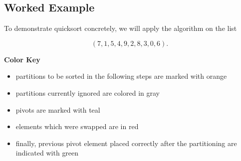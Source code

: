 \subsection{Worked Example}
To demonstrate quicksort concretely, we will apply the algorithm on the list 

\begin{equation*}
    (7, 1, 5, 4, 9, 2, 8, 3, 0, 6) \text{.}
\end{equation*}

\textbf{Color Key}
\begin{itemize}
    \item partitions to be sorted in the following steps are marked with {\color{Amber}orange}
    \item partitions currently ignored are colored in {\color{gray}gray}
    \item pivots are marked with {\color{cyan}teal}
    \item elements which were swapped are in {\color{red}red}
    \item finally, previous pivot element placed correctly after the partitioning are indicated with {\color{green}green}
\end{itemize}

